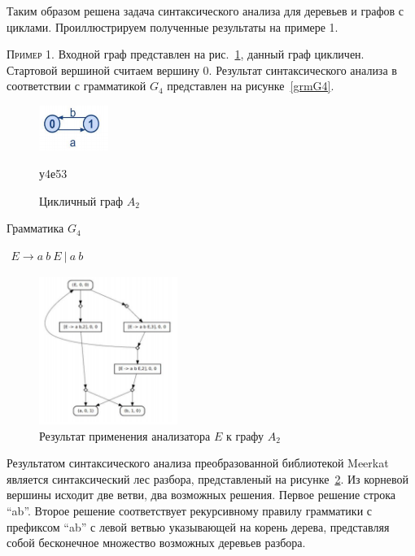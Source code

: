 Таким образом решена задача синтаксического анализа для деревьев и графов с циклами. Проиллюстрируем полученные результаты на примере 1.

\textsc{Пример 1.} 
Входной граф представлен на рис.~\ref{Graph2}, данный граф цикличен. Стартовой вершиной считаем вершину 0. Результат синтаксического анализа в соответствии с грамматикой $G_4$ представлен на рисунке~\ref{grmG4}.

\begin{figure}
 \centering
 \includegraphics[width=0.2\textwidth]{Smolina/pics/Graph2.png}
 \caption{Цикличный граф $A_2$}
 \label{Graph2}у4е53 
\end{figure}

\begin{listing}
\caption{Грамматика $G_4$}
\label{grmG4}
\centering
$\begin{array}{rl}
E \rightarrow a \ b \ E \ | \ a \ b
\end{array}$
 \end{listing}

\begin{figure}
 \centering
 \includegraphics[width=0.4\textwidth]{Smolina/pics/Tree1.png}
 \caption{Результат применения анализатора $E$ к графу $A_2$}
 \label{Tree1}
\end{figure}

Результатом синтаксического анализа преобразованной библиотекой Meerkat является синтаксический лес разбора, представленый на рисунке~\ref{Tree1}. Из корневой вершины исходит две ветви, два возможных решения. Первое решение строка ``ab''. Второе решение соответствует рекурсивному правилу грамматики с префиксом ``ab'' с левой ветвью указывающей на корень дерева, представляя собой бесконечное множество возможных деревьев разбора.

